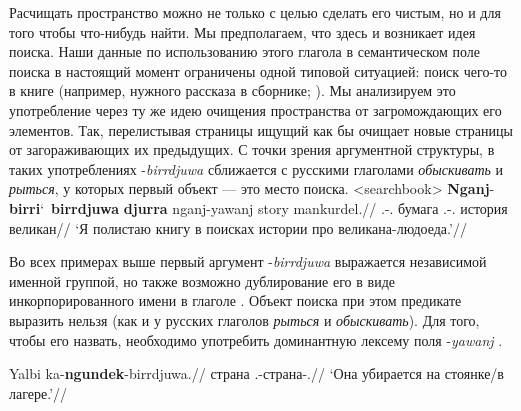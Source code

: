 Расчищать пространство можно не только с целью сделать его чистым, но и для того чтобы что-нибудь найти. Мы предполагаем, что здесь и возникает идея поиска. Наши данные по использованию этого глагола в семантическом поле поиска в настоящий момент ограничены одной типовой ситуацией: поиск чего-то в книге (например, нужного рассказа в сборнике; ). Мы анализируем это употребление через ту же идею %
очищения пространства от загромождающих его элементов.
Так, перелистывая страницы ищущий как бы очищает новые страницы от загораживающих их предыдущих. %
С точки зрения аргументной структуры, в таких употреблениях -\textit{birrdjuwa} сближается с русскими глаголами \textit{обыскивать} и \textit{рыться}, у которых первый объект --- это место поиска.
\ex<searchbook>\begingl
\gla \textbf{Nganj}-\textbf{birri}\char`~\textbf{birrdjuwa} \textbf{djurra} nganj-yawanj story mankurdel.//
\glb \Fsg.\Fut-\rdp\bdj.\Np{} бумага \Fsg.\Fut-\yaw.\Np{} история великан//
\glft `Я полистаю книгу в поисках истории про великана-людоеда.'//%
\endgl\xe

Во всех примерах выше первый аргумент -\textit{birrdjuwa} выражается независимой именной группой, но также возможно дублирование его в виде инкорпорированного имени в глаголе .
Объект поиска при этом предикате выразить нельзя (как и у русских глаголов \textit{рыться} и \textit{обыскивать}). Для того, чтобы его назвать, необходимо употребить доминантную лексему поля -\textit{yawanj} .

\begingl
\gla Yalbi ka-\textbf{ngundek}-birrdjuwa.//
\glb страна \Tsg.\Real-страна-\bdj.\Np{}//
\glft `Она убирается на стоянке/в лагере.'\trailingcitation{[Coleman~2010:17]}//
\endgl\xe

